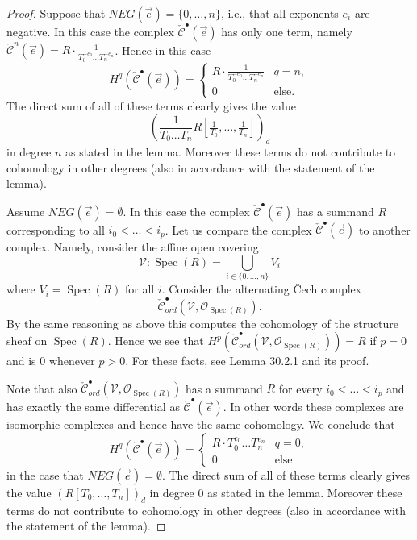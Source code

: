 \documentclass[UTF8,11pt]{ctexart}
\theoremstyle{definition}
\DeclareMathOperator{\Spec}{Spec}
\begin{document}
\begin{proof}
Suppose that $NEG(\vec e)=\{0,\ldots,n\}$, i.e., that all exponents $e_i$ are negative. In this case the complex $\check{\mathcal C}^{\bullet}(\vec e)$ has only one term, namely $\check{\mathcal C}^{n}(\vec e)=R\cdot\frac1{T_0^{-e_0}\ldots T_n^{-e_n}}$. Hence in this case
\[
H^q(\check{\mathcal C}^{\bullet}(\vec e))=
\begin{cases}R\cdot\frac1{T_0^{-e_0}\ldots T_n^{-e_n}}&q=n,\\0&\text{else}.\end{cases}
\]
The direct sum of all of these terms clearly gives the value
\[
\left(\frac1{T_0\ldots T_n}R[\tfrac1{T_0},\ldots,\tfrac1{T_n}]\right)_d
\]
in degree $n$ as stated in the lemma. Moreover these terms do not contribute to cohomology in other degrees (also in accordance with the statement of the lemma).

Assume $NEG(\vec e)=\emptyset$. In this case the complex $\check{\mathcal C}^{\bullet}(\vec e)$ has a summand $R$ corresponding to all $i_0<\ldots<i_p$. Let us compare the complex $\check{\mathcal C}^{\bullet}(\vec e)$ to another complex. Namely, consider the affine open covering
\[
\mathcal V:\Spec(R)=\bigcup_{i\in\{0,\ldots,n\}}V_i
\]
where $V_i=\Spec(R)$ for all $i$. Consider the alternating \v Cech complex
\[
\check{\mathcal C}_{ord}^{\bullet}(\mathcal V,\mathcal O_{\Spec(R)}).
\]
By the same reasoning as above this computes the cohomology of the structure sheaf on $\Spec(R)$. Hence we see that $H^p(\check{\mathcal C}_{ord}^{\bullet}(\mathcal V,\mathcal O_{\Spec(R)}))=R$ if $p=0$ and is $0$ whenever $p>0$. For these facts, see Lemma 30.2.1 and its proof.

Note that also $\check{\mathcal C}_{ord}^{\bullet}(\mathcal V,\mathcal O_{\Spec(R)})$ has a summand $R$ for every $i_0<\ldots<i_p$ and has exactly the same differential as $\check{\mathcal C}^{\bullet}(\vec e)$. In other words these complexes are isomorphic complexes and hence have the same cohomology. We conclude that
\[
H^q(\check{\mathcal C}^{\bullet}(\vec e))=
\begin{cases}R\cdot T_0^{e_0}\ldots T_n^{e_n}&q=0,\\0&\text{else}\end{cases}
\]
in the case that $NEG(\vec e)=\emptyset$. The direct sum of all of these terms clearly gives the value $(R[T_0,\ldots,T_n])_d$ in degree $0$ as stated in the lemma. Moreover these terms do not contribute to cohomology in other degrees (also in accordance with the statement of the lemma).


\end{proof}
\end{document}
